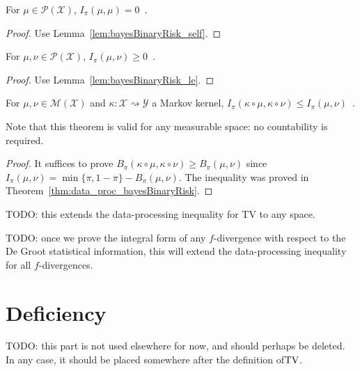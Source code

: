 \begin{lemma}
  \label{lem:deGrootInfo_self}
  For $\mu \in \mathcal P(\mathcal X)$, $I_\pi(\mu, \mu) = 0$~.
\end{lemma}

\begin{proof}%
{}
Use Lemma~\ref{lem:bayesBinaryRisk_self}.
\end{proof}

\begin{lemma}
  \label{lem:deGrootInfo_nonneg}
  For $\mu, \nu \in \mathcal P(\mathcal X)$, $I_\pi(\mu, \nu) \ge 0$~.
\end{lemma}

\begin{proof}%
{}
Use Lemma~\ref{lem:bayesBinaryRisk_le}.
\end{proof}

\begin{theorem}
  \label{thm:data_proc_deGrootInfo}
  For $\mu, \nu \in \mathcal M(\mathcal X)$ and $\kappa : \mathcal X \rightsquigarrow \mathcal Y$ a Markov kernel, $I_\pi(\kappa \circ \mu, \kappa \circ \nu) \le I_\pi(\mu, \nu)$~.
\end{theorem}

Note that this theorem is valid for any measurable space: no countability is required.

\begin{proof}%
{}
It suffices to prove $B_\pi(\kappa \circ \mu, \kappa \circ \nu) \ge B_\pi(\mu, \nu)$ since $I_\pi(\mu, \nu) = \min\{\pi, 1 - \pi\} - B_\pi(\mu, \nu)$.
The inequality was proved in Theorem~\ref{thm:data_proc_bayesBinaryRisk}.
\end{proof}

TODO: this extends the data-processing inequality for TV to any space.

TODO: once we prove the integral form of any $f$-divergence with respect to the De Groot statistical information, this will extend the data-processing inequality for all $f$-divergences. 

\section{Deficiency}

TODO: this part is not used elsewhere for now, and should perhaps be deleted.
In any case, it should be placed somewhere after the definition of$\operatorname{TV}$.

